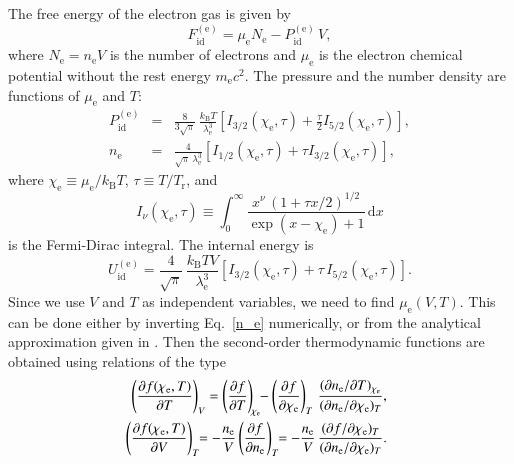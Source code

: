 \documentclass[traditabstract]{aa}
\newcommand{\beq}{\begin{equation}}
\newcommand{\eeq}{\end{equation}}
\newcommand{\bea}{\begin{eqnarray}}
\newcommand{\eea}{\end{eqnarray}}
\newcommand{\req}[1]{Eq.~\ref{#1}}
\newcommand{\chie}{\chi_\mathrm{e}}
\newcommand{\dd}{\mathrm{d}} %
\newcommand{\lambde}{\lambda_\mathrm{e}}
\newcommand{\mel}{m_\mathrm{e}}
\newcommand{\nel}{n_\mathrm{e}}
\newcommand{\mue}{\mu_\mathrm{e}}
\newcommand{\Nel}{N_\mathrm{e}}
\newcommand{\kB}{k_\mathrm{B}}
\newcommand{\Tr}{T_\mathrm{r}}
\begin{document}
The free energy of the electron gas is given by
\beq
   F_\mathrm{id}^\mathrm{(e)} =
   \mue \Nel  - P_\mathrm{id}^\mathrm{(e)}\,V,
\label{id_e}
\end{equation}
where $\Nel=\nel V$ is the number of electrons and $\mue$ is
the electron chemical potential without the rest energy
$\mel c^2$. The pressure and the number density are
functions of $\mue$ and $T$:
\bea
   P_\mathrm{id}^\mathrm{(e)} &=&
 \frac{8}{3\sqrt\pi}\,\frac{\kB T }{ \lambde^3}
   \left[ I_{3/2}(\chie,\tau)
   + \frac{\tau}{ 2}I_{5/2}(\chie,\tau) \right],
\label{P_e}
\\
   \nel &=&
           \frac{4}{\sqrt{\pi}\,\lambde^3}
   \left[ I_{1/2}(\chie,\tau)
   + \tau I_{3/2}(\chie,\tau) \right],
\label{n_e}
\eea
where 
$\chie\equiv\mue/\kB T$, $\tau\equiv T/\Tr$, and
\beq
   I_\nu(\chie,\tau) \equiv \int_0^\infty
  \frac{ x^\nu\,(1+\tau x/2)^{1/2}
    }{ \exp(x-\chie)+1 }\,{\dd}x
\label{I_nu}
\eeq
is the Fermi-Dirac integral. The internal energy is
\beq
   U_\mathrm{id}^\mathrm{(e)} =
             \frac{4}{\sqrt\pi}\,\frac{\kB T V}{ \lambde^3}
   \left[ I_{3/2}(\chie,\tau) +
         \tau\,I_{5/2}(\chie,\tau) \right].
\label{U_e}
\eeq
Since we use $V$ and $T$ as independent variables,
we need to find $\mue(V,T)$. This can be done either
by inverting \req{n_e} numerically, or from the analytical
approximation given in \citet{CP98}. Then the second-order
thermodynamic functions are obtained using  relations of the
type
\bea&&
   \left(\frac{\partial f(\chie,T)}{\partial T}\right)_V =
   \left(\frac{\partial f}{\partial T}\right)_{\!\chie} \!\!
   - \left(\frac{\partial f}{\partial \chie}\right)_T
   \,\frac{(\partial \nel/\partial T)_{\chie}
   }{(\partial \nel/\partial \chie)_T},
\hspace*{1.5em}
\label{fdT}
\\&&
   \left(\frac{\partial f(\chie,T)}{\partial V}\right)_T \!\! =
   - \frac{\nel}{V}
   \left(\frac{\partial f}{\partial \nel}\right)_T \!\! =
   - \frac{\nel}{V}
   \,\frac{(\partial f/\partial \chie)_T
   }{(\partial \nel/\partial\chie)_T} .
\hspace*{1.5em}
\label{fdV}
\eea
\end{document}
